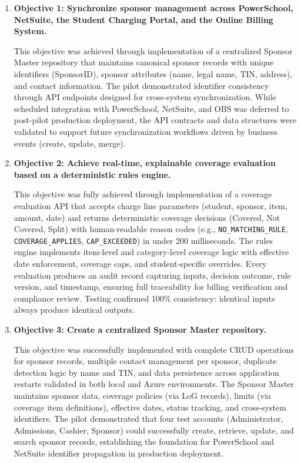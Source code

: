 \begin{enumerate}
    \item \textbf{Objective 1: Synchronize sponsor management across PowerSchool, NetSuite, the Student Charging Portal, and the Online Billing System.}
    
    This objective was achieved through implementation of a centralized Sponsor Master repository that maintains canonical sponsor records with unique identifiers (SponsorID), sponsor attributes (name, legal name, TIN, address), and contact information. The pilot demonstrated identifier consistency through API endpoints designed for cross-system synchronization. While scheduled integration with PowerSchool, NetSuite, and OBS was deferred to post-pilot production deployment, the API contracts and data structures were validated to support future synchronization workflows driven by business events (create, update, merge).
    
    \item \textbf{Objective 2: Achieve real-time, explainable coverage evaluation based on a deterministic rules engine.}
    
    This objective was fully achieved through implementation of a coverage evaluation API that accepts charge line parameters (student, sponsor, item, amount, date) and returns deterministic coverage decisions (Covered, Not Covered, Split) with human-readable reason codes (e.g., \texttt{NO\_MATCHING\_RULE}, \texttt{COVERAGE\_APPLIES}, \texttt{CAP\_EXCEEDED}) in under 200 milliseconds. The rules engine implements item-level and category-level coverage logic with effective date enforcement, coverage caps, and student-specific overrides. Every evaluation produces an audit record capturing inputs, decision outcome, rule version, and timestamp, ensuring full traceability for billing verification and compliance review. Testing confirmed 100\% consistency: identical inputs always produce identical outputs.
    
    \item \textbf{Objective 3: Create a centralized Sponsor Master repository.}
    
    This objective was successfully implemented with complete CRUD operations for sponsor records, multiple contact management per sponsor, duplicate detection logic by name and TIN, and data persistence across application restarts validated in both local and Azure environments. The Sponsor Master maintains sponsor data, coverage policies (via LoG records), limits (via coverage item definitions), effective dates, status tracking, and cross-system identifiers. The pilot demonstrated that four test accounts (Administrator, Admissions, Cashier, Sponsor) could successfully create, retrieve, update, and search sponsor records, establishing the foundation for PowerSchool and NetSuite identifier propagation in production deployment.
    

\end{enumerate}
